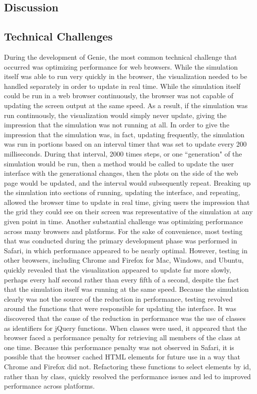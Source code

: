 \documentclass[12pt]{article}
\begin{document}
\begin{spacing}{1.5}
\section{Discussion}

\subsection{Technical Challenges}
During the development of Genie, the most common technical challenge that occurred was optimizing performance for web browsers. While the simulation itself was able to run very quickly in the browser, the visualization needed to be handled separately in order to update in real time. While the simulation itself could be run in a web browser continuously, the browser was not capable of updating the screen output at the same speed. As a result, if the simulation was run continuously, the visualization would simply never update, giving the impression that the simulation was not running at all. In order to give the impression that the simulation was, in fact, updating frequently, the simulation was run in portions based on an interval timer that was set to update every 200 milliseconds. During that interval, 2000 times steps, or one ``generation" of the simulation would be run, then a method would be called to update the user interface with the generational changes, then the plots on the side of the web page would be updated, and the interval would subsequently repeat. Breaking up the simulation into sections of running, updating the interface, and repeating, allowed the browser time to update in real time, giving users the impression that the grid they could see on their screen was representative of the simulation at any given point in time.\newline
\newline
Another substantial challenge was optimizing performance across many browsers and platforms. For the sake of convenience, most testing that was conducted during the primary development phase was performed in Safari, in which performance appeared to be nearly optimal. However, testing in other browsers, including Chrome and Firefox for Mac, Windows, and Ubuntu, quickly revealed that the visualization appeared to update far more slowly, perhaps every half second rather than every fifth of a second, despite the fact that the simulation itself was running at the same speed. Because the simulation clearly was not the source of the reduction in performance, testing revolved around the functions that were responsible for updating the interface. It was discovered that the cause of the reduction in performance was the use of classes as identifiers for jQuery functions. When classes were used, it appeared that the browser faced a performance penalty for retrieving all members of the class at one time. Because this performance penalty was not observed in Safari, it is possible that the browser cached HTML elements for future use in a way that Chrome and Firefox did not. Refactoring these functions to select elements by id, rather than by class, quickly resolved the performance issues and led to improved performance across platforms.


\end{spacing}
\end{document}
